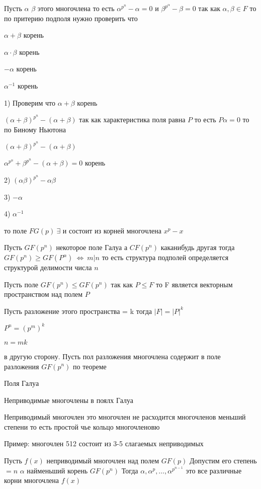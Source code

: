 Пусть $\alpha$ $\beta$ этого многочлена то есть $\alpha^{p^n} - \alpha = 0$ и
$\beta^{p^{\alpha}} - \beta = 0$ так как $\alpha, \beta \in F$ то по притерию
подполя нужно проверить что

$\alpha + \beta$ корень

$\alpha \cdot \beta$ корень

$-\alpha$ корень

$\alpha^{-1}$ корень

1) Проверим что $\alpha + \beta$ корень

$(\alpha + \beta)^{p^n} - (\alpha + \beta)$ так как характеристика поля равна
$P$ то есть $P\alpha = 0$ то по Биному Ньютона

$(\alpha + \beta)^{p^n} - (\alpha+\beta)$

$\alpha^{p^n} + \beta^{p^n} - (\alpha+\beta) = 0$ корень

2) $(\alpha \beta)^{p^n} - \alpha \beta$

3) $-\alpha$

4) $\alpha^{-1}$

то поле $FG(p) ~ \exists$ и состоит из корней многочлена $x^p - x$

\begin{theorem}
  Пусть $GF(p^n)$ некоторое поле Галуа а $CF(p^n)$ каканибудь другая тогда
  $GF(p^n) \ge GF(P^{\alpha}) ~ \Leftrightarrow ~ m|n$
  то есть структура подполей определяется структурой делимости числа $n$
\end{theorem}

Пусть поле $GF(p^n) \le GF(p^n)$ так как $P \le F$ то F является векторным
пространством над полем $P$

Пусть разложение этого пространства = k тогда $|F| = |P|^k$

$P^n = (p^m)^k$

$n = mk$

в другую сторону. Пусть пол разложения многочлена содержит в поле разложения
$GF(p^n)$ по теореме

\begin{title}[\large]
  Поля Галуа
\end{title}

Неприводимые многочлены в поялх Галуа

Неприводимый многочлен это многочлен не расходится многочленов меньший степени
то есть простой чье кольцо многочленовю

Пример: многочлен 512 состоит из 3-5 слагаемых неприводимых

Пусть $f(x)$ неприводимый многочлен над полем $GF(p)$ Допустим его степень $=n$
$\alpha$ найменьший корень $GF(p^n)$ Тогда $\alpha, \alpha^p, \ldots,
\alpha^{p^{n-1}}$ это все различные корни многочлена $f(x)$

